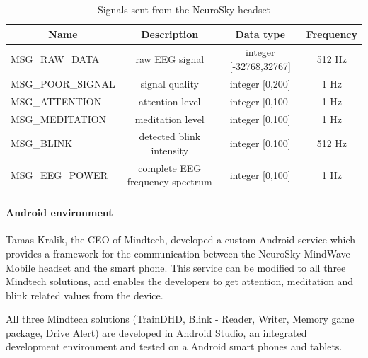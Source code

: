 \documentclass[letterpaper,10pt]{article}
\begin{document}
\begin{table}[h]
\centering
\caption{Signals sent from the NeuroSky headset}
\label{fig:neuroskysignals}
\begin{tabular}{lccc}
\multicolumn{1}{c}{\textbf{Name}}       & \textbf{Description}                                 & \textbf{Data type}                               & \textbf{Frequency}  \\ \hline
\multicolumn{1}{|l|}{MSG\_RAW\_DATA}    & \multicolumn{1}{c|}{raw EEG signal}                  & \multicolumn{1}{c|}{integer  {[}-32768,32767{]}} & \multicolumn{1}{c|}{512 Hz} \\ \hline
\multicolumn{1}{|l|}{MSG\_POOR\_SIGNAL} & \multicolumn{1}{c|}{signal quality}                  & \multicolumn{1}{c|}{integer {[}0,200{]}}         & \multicolumn{1}{c|}{1 Hz}   \\ \hline
\multicolumn{1}{|l|}{MSG\_ATTENTION}    & \multicolumn{1}{c|}{attention level}                 & \multicolumn{1}{c|}{integer {[}0,100{]}}         & \multicolumn{1}{c|}{1 Hz}   \\ \hline
\multicolumn{1}{|l|}{MSG\_MEDITATION}   & \multicolumn{1}{c|}{meditation level}                & \multicolumn{1}{c|}{integer {[}0,100{]}}         & \multicolumn{1}{c|}{1 Hz}   \\ \hline
\multicolumn{1}{|l|}{MSG\_BLINK}        & \multicolumn{1}{c|}{detected blink intensity}        & \multicolumn{1}{c|}{integer {[}0,100{]}}         & \multicolumn{1}{c|}{512 Hz} \\ \hline
\multicolumn{1}{|l|}{MSG\_EEG\_POWER}   & \multicolumn{1}{c|}{complete EEG frequency spectrum} & \multicolumn{1}{c|}{integer {[}0,100{]}}         & \multicolumn{1}{c|}{1 Hz}   \\ \hline
\end{tabular}
\end{table}


\paragraph{Android environment}

Tamas Kralik, the CEO of Mindtech, developed a custom Android service which provides a framework for the communication between the NeuroSky MindWave Mobile headset and the smart phone. This service can be modified to all three Mindtech solutions, and enables the developers to get attention, meditation and blink related values from the device.

All three Mindtech solutions (TrainDHD, Blink - Reader, Writer, Memory game package, Drive Alert) are developed in Android Studio, an integrated development environment and tested on a Android smart phones and tablets.
\end{document}
